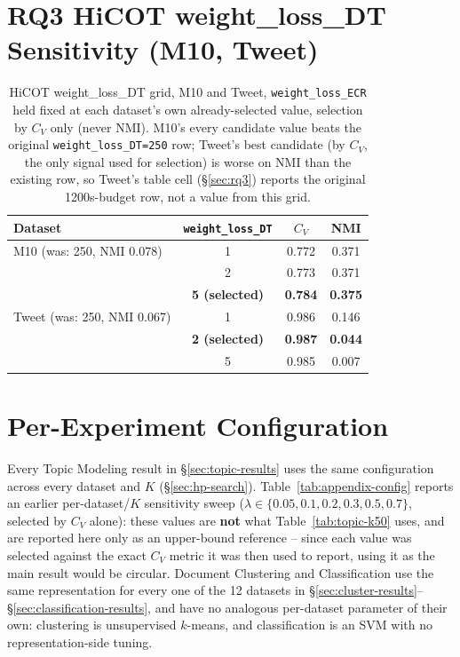\documentclass[11pt]{article}
\begin{document}
\section{RQ3 HiCOT weight\_loss\_DT Sensitivity (M10, Tweet)}
\label{sec:rq3_dt_ablation}

\begin{table}[h]
\centering
\small
\begin{tabular}{lccc}
\toprule
Dataset & \texttt{weight\_loss\_DT} & $C_V$ & NMI \\
\midrule
M10 (was: 250, NMI 0.078) & 1 & 0.772 & 0.371 \\
                          & 2 & 0.773 & 0.371 \\
                          & \textbf{5 (selected)} & \textbf{0.784} & \textbf{0.375} \\
\midrule
Tweet (was: 250, NMI 0.067) & 1 & 0.986 & 0.146 \\
                            & \textbf{2 (selected)} & \textbf{0.987} & \textbf{0.044} \\
                            & 5 & 0.985 & 0.007 \\
\bottomrule
\end{tabular}
\caption{HiCOT weight\_loss\_DT grid, M10 and Tweet, \texttt{weight\_loss\_ECR} held fixed at each dataset's own already-selected value, selection by $C_V$ only (never NMI). M10's every candidate value beats the original \texttt{weight\_loss\_DT=250} row; Tweet's best candidate (by $C_V$, the only signal used for selection) is worse on NMI than the existing row, so Tweet's table cell (\S\ref{sec:rq3}) reports the original 1200s-budget row, not a value from this grid.}
\label{tab:rq3-dt-ablation}
\end{table}

\section{Per-Experiment Configuration}
\label{sec:appendix-config}
Every Topic Modeling result in \S\ref{sec:topic-results} uses the same configuration across every dataset and $K$ (\S\ref{sec:hp-search}). Table~\ref{tab:appendix-config} reports an earlier per-dataset/$K$ sensitivity sweep ($\lambda\in\{0.05,0.1,0.2,0.3,0.5,0.7\}$, selected by $C_V$ alone): these values are \textbf{not} what Table~\ref{tab:topic-k50} uses, and are reported here only as an upper-bound reference -- since each value was selected against the exact $C_V$ metric it was then used to report, using it as the main result would be circular. Document Clustering and Classification use the same representation for every one of the 12 datasets in \S\ref{sec:cluster-results}--\S\ref{sec:classification-results}, and have no analogous per-dataset parameter of their own: clustering is unsupervised $k$-means, and classification is an SVM with no representation-side tuning.
\end{document}
